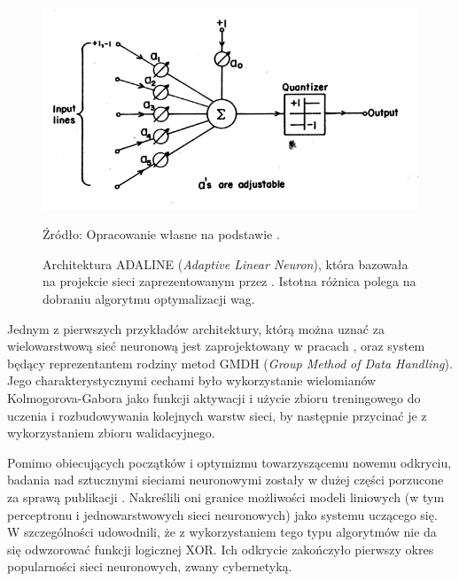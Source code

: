\documentclass[12pt,a4paper,twoside]{article}
\newcommand{\source}[1]{\caption*{\hfill Źródło: {#1}} }
\begin{document}
\begin{figure}[h]
  \centering
\includegraphics[scale=0.4]{../obrazy/fig:ADALINE.png}
\caption{Architektura ADALINE (\textit{Adaptive Linear Neuron}), która bazowała na projekcie sieci zaprezentowanym przez \citet{mcculloch1943}. Istotna różnica polega na dobraniu algorytmu optymalizacji wag. \label{fig:ADALINE}}
\source{Opracowanie własne na podstawie \citet{widrow1960}.}
\end{figure}

Jednym z pierwszych przykładów architektury, którą można uznać za wielowarstwową sieć neuronową jest zaprojektowany w pracach \citet{ivakhnenko1965}, \citet{ivakhnenko1967} oraz \citet{ivakhnenko1968} system będący reprezentantem rodziny metod GMDH (\textit{Group Method of Data Handling}). Jego charakterystycznymi cechami było wykorzystanie wielomianów Kolmogorova-Gabora jako funkcji aktywacji i użycie zbioru treningowego do uczenia i rozbudowywania kolejnych warstw sieci, by następnie przycinać je z wykorzystaniem zbioru walidacyjnego.

Pomimo obiecujących początków i optymizmu towarzyszącemu nowemu odkryciu, badania nad sztucznymi sieciami neuronowymi zostały w dużej części porzucone za sprawą publikacji \citet{minsky1969}. Nakreślili oni granice możliwości modeli liniowych (w tym perceptronu i jednowarstwowych sieci neuronowych) jako systemu uczącego się. W szczególności udowodnili, że z wykorzystaniem tego typu algorytmów nie da się odwzorować funkcji logicznej XOR. Ich odkrycie zakończyło pierwszy okres popularności sieci neuronowych, zwany cybernetyką.
\end{document}
